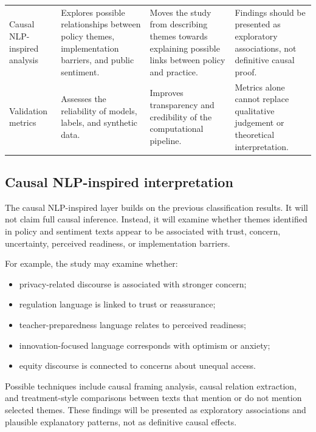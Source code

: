 \documentclass{article}
\begin{document}
\begin{table}[h]
\begin{tabular}{L{0.19\textwidth} L{0.27\textwidth} L{0.25\textwidth} L{0.22\textwidth}}
Causal NLP-inspired analysis &
Explores possible relationships between policy themes, implementation barriers,
and public sentiment. &
Moves the study from describing themes towards explaining possible links between
policy and practice. &
Findings should be presented as exploratory associations, not definitive causal
proof. \\[.15cm]

Validation metrics &
Assesses the reliability of models, labels, and synthetic data. &
Improves transparency and credibility of the computational pipeline. &
Metrics alone cannot replace qualitative judgement or theoretical interpretation. \\

\hline
\end{tabular}
\end{table}

\subsection{Causal NLP-inspired interpretation}

The causal NLP-inspired layer builds on the previous classification results. It
will not claim full causal inference. Instead, it will examine whether themes
identified in policy and sentiment texts appear to be associated with trust,
concern, uncertainty, perceived readiness, or implementation barriers.

For example, the study may examine whether:

\begin{itemize}[leftmargin=*]
    \item privacy-related discourse is associated with stronger concern;
    \item regulation language is linked to trust or reassurance;
    \item teacher-preparedness language relates to perceived readiness;
    \item innovation-focused language corresponds with optimism or anxiety;
    \item equity discourse is connected to concerns about unequal access.
\end{itemize}

Possible techniques include causal framing analysis, causal relation extraction,
and treatment-style comparisons between texts that mention or do not mention
selected themes. These findings will be presented as exploratory associations
and plausible explanatory patterns, not as definitive causal effects.
\end{document}
